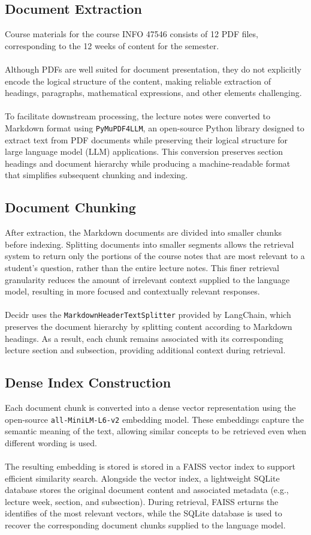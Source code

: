 \documentclass[12pt, a4paper]{report}
\begin{document}
\subsection{Document Extraction}
Course materials for the course INFO 47546 consists of 12 PDF files, corresponding to the 12 weeks of content for the semester.~\\~\\
Although PDFs are well suited for document presentation, they do not explicitly encode the logical structure of the content, making reliable extraction of headings, paragraphs, mathematical expressions, and other elements challenging.~\\~\\
To facilitate downstream processing, the lecture notes were converted to Markdown format using \texttt{PyMuPDF4LLM}, an open-source Python library designed to extract text from PDF documents while preserving their logical structure for large language model (LLM) applications. This conversion preserves section headings and document hierarchy while producing a machine-readable format that simplifies subsequent chunking and indexing.
\subsection{Document Chunking}
After extraction, the Markdown documents are divided into smaller chunks before indexing. Splitting documents into smaller segments allows the retrieval system to return only the portions of the course notes that are most relevant to a student's question, rather than the entire lecture notes. This finer retrieval granularity reduces the amount of irrelevant context supplied to the language model, resulting in more focused and contextually relevant responses.~\\~\\
Decidr uses the \texttt{MarkdownHeaderTextSplitter} provided by LangChain, which preserves the document hierarchy by splitting content according to Markdown headings. As a result, each chunk remains associated with its corresponding lecture section and subsection, providing additional context during retrieval.
\subsection{Dense Index Construction}
Each document chunk is converted into a dense vector representation using the open-source \texttt{all-MiniLM-L6-v2} embedding model. These embeddings capture the semantic meaning of the text, allowing similar concepts to be retrieved even when different wording is used.~\\~\\
The resulting embedding is stored is stored in a FAISS vector index \cite{douze24} to support efficient similarity search. Alongside the vector index, a lightweight SQLite database stores the original document content and associated metadata (e.g., lecture week, section, and subsection). During retrieval, FAISS erturns the identifies of the most relevant vectors, while the SQLite database is used to recover the corresponding document chunks supplied to the language model.
\end{document}
